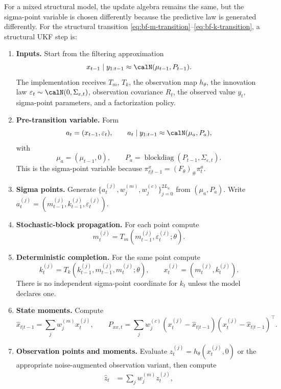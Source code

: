 For a mixed structural model, the update algebra remains the same, but the
sigma-point variable is chosen differently because the predictive law is
generated differently.  For the structural transition
\eqref{eq:bf-m-transition}--\eqref{eq:bf-k-transition}, a structural UKF step
is:
\begin{enumerate}[label=\textbf{S\arabic*.}]
  \item \textbf{Inputs.}  Start from the filtering approximation
    \[
      x_{t-1}\mid y_{1:t-1} \approx \calN(\mu_{t-1},P_{t-1}).
    \]
    The implementation receives $T_m$, $T_k$, the observation map
    $h_\theta$, the innovation law
    $\varepsilon_t\sim\calN(0,\Sigma_{\varepsilon,t})$, observation covariance
    $R_t$, the observed value $y_t$, sigma-point parameters, and a
    factorization policy.
  \item \textbf{Pre-transition variable.}  Form
    \[
      a_t = (x_{t-1},\varepsilon_t),
      \qquad
      a_t\mid y_{1:t-1}\approx\calN(\mu_a,P_a),
    \]
    with
    \[
      \mu_a=(\mu_{t-1},0),\qquad
      P_a=\operatorname{blockdiag}(P_{t-1},\Sigma_{\varepsilon,t}).
    \]
    This is the sigma-point variable because
    $\pi_{t|t-1}^x=(F_\theta)_\#\pi_t^a$.
  \item \textbf{Sigma points.}  Generate
    $\{a_t^{(j)},w_j^{(m)},w_j^{(c)}\}_{j=0}^{2L_a}$ from
    $(\mu_a,P_a)$.  Write
    $a_t^{(j)}=(m_{t-1}^{(j)},k_{t-1}^{(j)},\varepsilon_t^{(j)})$.
  \item \textbf{Stochastic-block propagation.}  For each point compute
    \[
      m_t^{(j)}
      =
      T_m(m_{t-1}^{(j)},\varepsilon_t^{(j)};\theta).
    \]
  \item \textbf{Deterministic completion.}  For the same point compute
    \[
      k_t^{(j)}
      =
      T_k(k_{t-1}^{(j)},m_{t-1}^{(j)},m_t^{(j)};\theta),
      \qquad
      x_t^{(j)}=(m_t^{(j)},k_t^{(j)}).
    \]
    There is no independent sigma-point coordinate for $k_t$ unless the model
    declares one.
  \item \textbf{State moments.}  Compute
    \[
      \hat x_{t|t-1}=\sum_j w_j^{(m)}x_t^{(j)},\qquad
      P_{xx,t}=\sum_j w_j^{(c)}
      (x_t^{(j)}-\hat x_{t|t-1})(x_t^{(j)}-\hat x_{t|t-1})^\top .
    \]
  \item \textbf{Observation points and moments.}  Evaluate
    $z_t^{(j)}=h_\theta(x_t^{(j)},0)$ or the appropriate noise-augmented
    observation variant, then compute
    \begin{align}
      \hat z_t &= \sum_j w_j^{(m)}z_t^{(j)},\\

\end{align}
\end{enumerate}
